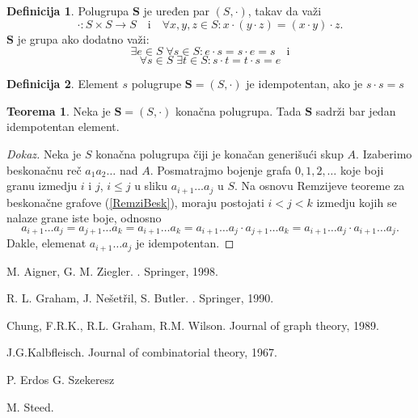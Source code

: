 \documentclass{article}
\theoremstyle{definition}
\newtheorem{definicija}{Definicija}[section]
\newtheorem{teorema}{Teorema}[section]
\newcommand{\dokaz}[1]{\begin{proof}[Dokaz]#1\end{proof}}
\begin{document}
	\begin{definicija}
		Polugrupa $\mathbf{S}$ je uređen par $(S,\cdot)$, takav da važi
		\[
		\cdot:S\times S \rightarrow S \quad\mathrm{i}\quad \forall x,y,z\in S: x\cdot (y\cdot z)=(x\cdot y)\cdot z.
		\]
		$\mathbf{S}$ je grupa ako dodatno važi:
		\[
		\exists e\in S\; \forall s \in S: e\cdot s=s\cdot e=s \quad \mathrm{i}
		\]
		\[
		\forall s\in S\; \exists t \in S: s\cdot t=t\cdot s=e
		\]
	\end{definicija}
	\begin{definicija}
		Element $s$ polugrupe $\mathbf{S}=(S,\cdot)$ je idempotentan, ako je $s\cdot s=s$ 
	\end{definicija}
	\begin{teorema}
		Neka je $\mathbf{S}=(S,\cdot)$ konačna polugrupa. Tada $\mathbf{S}$ sadrži bar jedan idempotentan element.
	\end{teorema}
	\dokaz{
		Neka je $S$ konačna polugrupa čiji je konačan generišući skup $A$. Izaberimo beskonačnu reč $a_1 a_2\ldots$ nad $A$. Posmatrajmo bojenje  grafa $0,1,2,\ldots$ koje boji granu izmedju $i$ i $j$, $i\leq j$ u sliku $a_{i+1} \ldots a_j$ u $S$. Na osnovu Remzijeve teoreme za beskonačne grafove (\ref{RemziBesk}), moraju postojati $i<j<k$ izmedju kojih se nalaze grane iste boje, odnosno
		\[
		a_{i+1}\ldots a_j=a_{j+1}\ldots a_k=a_{i+1}\ldots a_k=	a_{i+1}\ldots a_j\cdot 	a_{j+1}\ldots a_k=a_{i+1}\ldots a_j\cdot 	a_{i+1}\ldots a_j.
		\]
		Dakle, elemenat $a_{i+1}\ldots a_j$ je idempotentan.
		
	}
	\newpage
	
	\begin{thebibliography}{99}
		M. Aigner, G. M. Ziegler.
		.
		\newblock Springer, 1998.
		
		R. L. Graham, J. Nešetřil, S. Butler.
		.
		\newblock Springer, 1990.
		
		Chung, F.R.K., R.L. Graham, R.M. Wilson.
		\newblock Journal of graph theory, 1989.
		
		J.G.Kalbfleisch.
		\newblock Journal of combinatorial theory, 1967.
		
		P. Erdos G. Szekeresz
		
		M. Steed.
		
		
	\end{thebibliography}	
	
\end{document}
